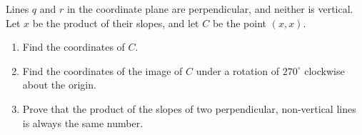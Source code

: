 Lines $q$ and $r$ in the coordinate plane are perpendicular, and neither is vertical. Let $x$ be the product of their slopes, and let $C$ be the point $(x,x)$.
\begin{enumerate}
\item[(a)] Find the coordinates of $C$.
\item[(b)] Find the coordinates of the image of $C$ under a rotation of $270^\circ$ clockwise about the origin.
\item[(c)] Prove that the product of the slopes of two perpendicular, non-vertical lines is always the same number.
\end{enumerate}
